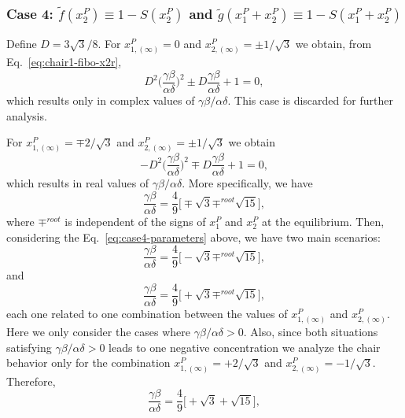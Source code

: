 \subsubsection{Case 4: $\tilde{f}(x_2^P) \equiv 1 - S(x_2^P)$ and $\tilde{g}(x_1^P + x_2^P) \equiv 1 - S(x_1^P + x_2^P)$}

Define $D = 3\sqrt{3}/8$. For $x_{1,(\infty)}^P = 0$ and $x_{2,(\infty)}^P = \pm 1/\sqrt{3}$ we obtain,
 from Eq.~\ref{eq:chair1-fibo-x2r},  
\begin{equation}
    D^2\bigg(\frac{\gamma\beta}{\alpha\delta}\bigg)^2 \pm D\frac{\gamma\beta}{\alpha\delta} + 1 = 0,
\end{equation}
which results only in complex values of $\gamma\beta/\alpha\delta$. This case is discarded for further analysis.

For $x_{1,(\infty)}^P = \mp 2/\sqrt{3}$ and $x_{2,(\infty)}^P = \pm 1/\sqrt{3}$ we obtain 
\begin{equation}
    -D^2\bigg(\frac{\gamma\beta}{\alpha\delta}\bigg)^2 \mp D\frac{\gamma\beta}{\alpha\delta} + 1 = 0,
\end{equation}
which results in real values of $\gamma\beta/\alpha\delta$. More specifically, we have 
\begin{equation} \label{eq:case4-parameters}
    \frac{\gamma\beta}{\alpha\delta} = \frac{4}{9}\bigg[ \mp \sqrt{3} \mp^{root} \sqrt{15} \bigg],
\end{equation}
where $\mp^{root}$ is independent of the signs of $x_1^P$ and $x_2^P$ at the equilibrium. Then,
considering the Eq.~\ref{eq:case4-parameters} above, we have two main scenarios:
\begin{equation}
    \frac{\gamma\beta}{\alpha\delta} = \frac{4}{9}\bigg[ - \sqrt{3} \mp^{root} \sqrt{15} \bigg],
\end{equation} 
and 
\begin{equation}
    \frac{\gamma\beta}{\alpha\delta} = \frac{4}{9}\bigg[ + \sqrt{3} \mp^{root} \sqrt{15} \bigg],
\end{equation}
each one related to one combination between the values of $x_{1,(\infty)}^P$ and $x_{2,(\infty)}^P$.
Here we only consider the cases where $\gamma\beta/\alpha\delta > 0$. Also, since both situations 
satisfying $\gamma\beta/\alpha\delta > 0$ leads to one negative concentration we analyze the chair 
behavior only for the combination $x_{1,(\infty)}^P = + 2/\sqrt{3}$ and $x_{2,(\infty)}^P = - 1/\sqrt{3}$. 
Therefore,
\begin{equation}
    \frac{\gamma\beta}{\alpha\delta} = \frac{4}{9}\bigg[ + \sqrt{3} + \sqrt{15} \bigg],
\end{equation}
